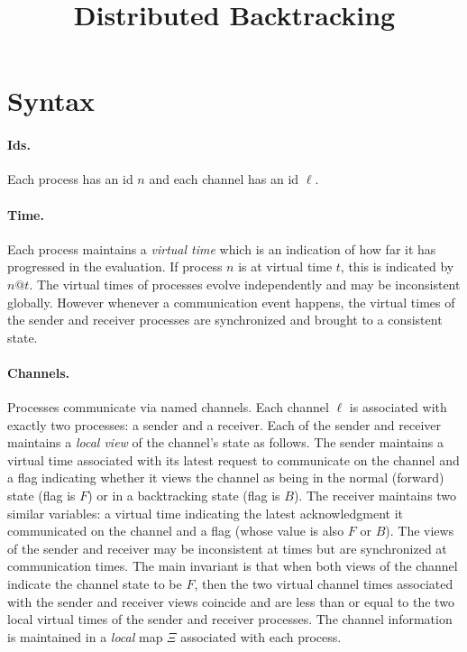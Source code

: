 \documentclass{article}
\title{Distributed Backtracking}
\author{}
\date{}
\begin{document}
\maketitle

\newcommand{\todo}[1]{\fbox{#1}}

\newcommand{\alt}{~|~}
\newcommand{\parc}[2]{#1 \,\|\, #2}
\newcommand{\send}[2]{\texttt{send}~#1~#2}
\newcommand{\stable}[1]{\texttt{stable}~#1}
\newcommand{\stableu}[1]{\underline{\texttt{stable}}~#1}
\newcommand{\backtrack}[1]{\texttt{backtrack}~#1}
\newcommand{\abacktrack}{\texttt{backtrack}\_}
\newcommand{\recv}[4]{\texttt{recv}~(#1.#2) \talloblong (#3.#4)}
\newcommand{\proc}[5]{\langle #1@#5:~ #3, #2,#4 \rangle}

\section{Syntax} 

\paragraph*{Ids.} Each process has an id $n$ and each channel has an id
$\ell$.

\paragraph*{Time.} Each process maintains a \emph{virtual time} which is an
indication of how far it has progressed in the evaluation. If process $n$ is
at virtual time $t$, this is indicated by $n@t$. The virtual times of
processes evolve independently and may be inconsistent globally. However
whenever a communication event happens, the virtual times of the sender and
receiver processes are synchronized and brought to a consistent state.

\paragraph*{Channels.} Processes communicate via named channels. Each channel
$\ell$ is associated with exactly two processes: a sender and a receiver.
Each of the sender and receiver maintains a \emph{local view} of the
channel's state as follows. The sender maintains a virtual time associated
with its latest request to communicate on the channel and a flag indicating
whether it views the channel as being in the normal (forward) state (flag is
$F$) or in a backtracking state (flag is $B$). The receiver maintains two
similar variables: a virtual time indicating the latest acknowledgment it
communicated on the channel and a flag (whose value is also $F$ or $B$).  The
views of the sender and receiver may be inconsistent at times but are
synchronized at communication times. The main invariant is that when both
views of the channel indicate the channel state to be $F$, then the two
virtual channel times associated with the sender and receiver views coincide
and are less than or equal to the two local virtual times of the sender and
receiver processes. The channel information is maintained in a \emph{local}
map $\Xi$ associated with each process.
\end{document}
